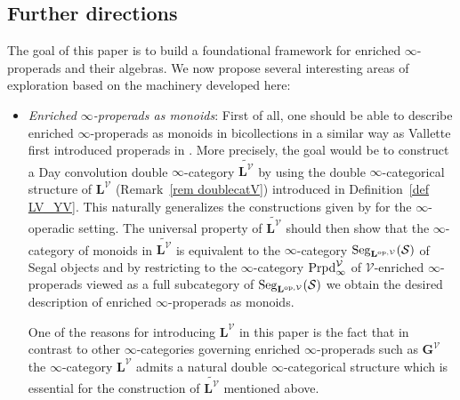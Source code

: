 \documentclass{amsart}
\numberwithin{theorem}{subsection}
\theoremstyle{definition}
\providecommand{\op}{\mathrm{op}}
\newcommand{\xS}{\mathcal{S}}
\newcommand{\xV}{\mathcal{V}}
\newcommand{\name}[1]{\ensuremath{\text{\textup{#1}}}}
\newcommand{\levelg}{\mathbf{L}}
\newcommand{\levelV}{\levelg^\xV}
\newcommand{\oplevelV}{\levelg^{\op,\xV}}
\newcommand{\bbY}{\mathbf{G}}
\newcommand{\bbYV}{\bbY^{\xV}}
\newcommand{\Seg}{\name{Seg}}
\begin{document}
\subsection{Further directions}
The goal of this paper is to build a foundational framework for enriched $\infty$-properads and their algebras. 
We now propose several interesting areas of exploration  based on the machinery developed here:
\begin{itemize}[leftmargin=*]
\item \emph{Enriched $\infty$-properads as monoids}: 
First of all, one should be able to describe enriched $\infty$-properads as monoids in bicollections in a similar way as Vallette first introduced properads in \cite{Vallette:KDP}.
More precisely, the goal would be to construct a Day convolution double $\infty$-category $\widetilde{\levelV}$ by using the double $\infty$-categorical structure of $\levelV$ (Remark~\ref{rem doublecatV}) introduced in Definition~\ref{def LV_YV}.
This naturally generalizes the constructions given by \cite{HaugsengSS} for the $\infty$-operadic setting. 
The universal property of $\widetilde{\levelV}$ should then show that the $\infty$-category of monoids in $\widetilde{\levelV}$ is equivalent to the $\infty$-category $\Seg_{\oplevelV}(\xS)$ of Segal objects and by restricting to the $\infty$-category $\name{Prpd}^\xV_\infty$ of $\xV$-enriched $\infty$-properads viewed as a full subcategory of $\Seg_{\oplevelV}(\xS)$ we obtain the desired description of enriched $\infty$-properads as monoids. 

One of the reasons for introducing $\levelV$ in this paper is the fact that in contrast to other $\infty$-categories governing enriched $\infty$-properads such as $\bbYV$ the $\infty$-category $\levelV$ admits a natural double $\infty$-categorical structure which is essential for the construction of $\widetilde{\levelV}$ mentioned above.


\end{itemize}
\end{document}

